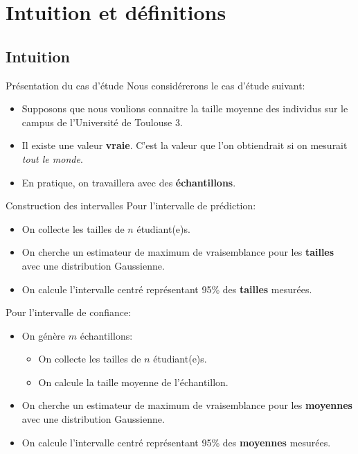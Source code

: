 \section[Intuition et définitions]{Intuition et définitions}

\subsection[Intuition]{Intuition}

\begin{frame}{Présentation du cas d'étude}
	Nous considérerons le cas d'étude suivant:
	\begin{itemize}
		\item Supposons que nous voulions connaitre la taille moyenne des individus sur le campus de l'Université de Toulouse 3.
		\pause
		\item Il existe une valeur \textbf{vraie}. C'est la valeur que l'on obtiendrait si on mesurait \textit{tout le monde}.
		\pause
		\item En pratique, on travaillera avec des \textbf{échantillons}.
	\end{itemize}
\end{frame}

\begin{frame}{Construction des intervalles}
	Pour l'intervalle de prédiction:
	\begin{itemize}
		\item On collecte les tailles de $n$ étudiant(e)s.
		\item On cherche un estimateur de maximum de vraisemblance pour les \textbf{tailles} avec une distribution Gaussienne.
		\item On calcule l'intervalle centré représentant 95\% des \textbf{tailles} mesurées.
	\end{itemize}
	\pause
	Pour l'intervalle de confiance:
	\begin{itemize}
		\item On génère $m$ échantillons:
		\begin{itemize}
			\item On collecte les tailles de $n$ étudiant(e)s.
			\item On calcule la taille moyenne de l'échantillon.
		\end{itemize}		
		\item On cherche un estimateur de maximum de vraisemblance pour les \textbf{moyennes} avec une distribution Gaussienne.
		\item On calcule l'intervalle centré représentant 95\% des \textbf{moyennes} mesurées.
	\end{itemize}
\end{frame}

